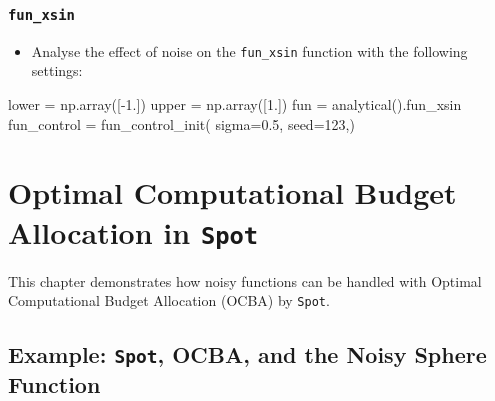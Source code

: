 \documentclass[
  letterpaper,
  DIV=11,
  numbers=noendperiod]{scrreprt}
\newenvironment{Shaded}{\begin{snugshade}}{\end{snugshade}}
\newcommand{\DecValTok}[1]{\textcolor[rgb]{0.68,0.00,0.00}{#1}}
\newcommand{\FloatTok}[1]{\textcolor[rgb]{0.68,0.00,0.00}{#1}}
\newcommand{\NormalTok}[1]{\textcolor[rgb]{0.00,0.23,0.31}{#1}}
\newcommand{\OperatorTok}[1]{\textcolor[rgb]{0.37,0.37,0.37}{#1}}
\providecommand{\tightlist}{%
  \setlength{\itemsep}{0pt}\setlength{\parskip}{0pt}}\usepackage{longtable,booktabs,array}
\begin{document}
\hypertarget{fun_xsin}{%
\subsection{\texorpdfstring{\texttt{fun\_xsin}}{fun\_xsin}}\label{fun_xsin}}

\begin{itemize}
\tightlist
\item
  Analyse the effect of noise on the \texttt{fun\_xsin} function with
  the following settings:
\end{itemize}

\begin{Shaded}
\begin{Highlighting}[]
\NormalTok{lower }\OperatorTok{=}\NormalTok{ np.array([}\OperatorTok{{-}}\FloatTok{1.}\NormalTok{])}
\NormalTok{upper }\OperatorTok{=}\NormalTok{ np.array([}\FloatTok{1.}\NormalTok{])}
\NormalTok{fun }\OperatorTok{=}\NormalTok{ analytical().fun\_xsin}
\NormalTok{fun\_control }\OperatorTok{=}\NormalTok{ fun\_control\_init(    }
\NormalTok{    sigma}\OperatorTok{=}\FloatTok{0.5}\NormalTok{,}
\NormalTok{    seed}\OperatorTok{=}\DecValTok{123}\NormalTok{,)}
\end{Highlighting}
\end{Shaded}

\hypertarget{sec-ocba}{%
\chapter{\texorpdfstring{Optimal Computational Budget Allocation in
\texttt{Spot}}{Optimal Computational Budget Allocation in Spot}}\label{sec-ocba}}

This chapter demonstrates how noisy functions can be handled with
Optimal Computational Budget Allocation (OCBA) by \texttt{Spot}.

\hypertarget{example-spot-ocba-and-the-noisy-sphere-function}{%
\section{\texorpdfstring{Example: \texttt{Spot}, OCBA, and the Noisy
Sphere
Function}{Example: Spot, OCBA, and the Noisy Sphere Function}}\label{example-spot-ocba-and-the-noisy-sphere-function}}
\end{document}
